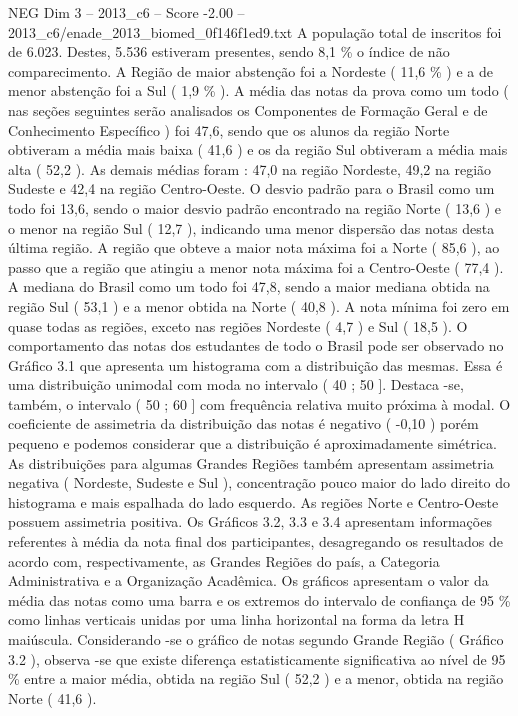 \begin{textsample}{NEG Dim 3 – 2013\_c6 – Score -2.00 – 2013\_c6/enade\_2013\_biomed\_0f146f1ed9.txt}
A população total de inscritos foi de 6.023.
Destes, 5.536 estiveram presentes, sendo 8,1 \% o índice de não comparecimento.
A Região de maior abstenção foi a Nordeste ( 11,6 \% ) e a de menor abstenção foi a Sul ( 1,9 \% ).
A média das notas da prova como um todo ( nas seções seguintes serão analisados os Componentes de Formação Geral e de Conhecimento Específico ) foi 47,6, sendo que os alunos da região Norte obtiveram a média mais baixa ( 41,6 ) e os da região Sul obtiveram a média mais alta ( 52,2 ).
As demais médias foram : 47,0 na região Nordeste, 49,2 na região Sudeste e 42,4 na região Centro-Oeste.
O desvio padrão para o Brasil como um todo foi 13,6, sendo o maior desvio padrão encontrado na região Norte ( 13,6 ) e o menor na região Sul ( 12,7 ), indicando uma menor dispersão das notas desta última região.
A região que obteve a maior nota máxima foi a Norte ( 85,6 ), ao passo que a região que atingiu a menor nota máxima foi a Centro-Oeste ( 77,4 ).
A mediana do Brasil como um todo foi 47,8, sendo a maior mediana obtida na região Sul ( 53,1 ) e a menor obtida na Norte ( 40,8 ).
A nota mínima foi zero em quase todas as regiões, exceto nas regiões Nordeste ( 4,7 ) e Sul ( 18,5 ).
O comportamento das notas dos estudantes de todo o Brasil pode ser observado no Gráfico 3.1 que apresenta um histograma com a distribuição das mesmas.
Essa é uma distribuição unimodal com moda no intervalo ( 40 ; 50 ].
Destaca -se, também, o intervalo ( 50 ; 60 ] com frequência relativa muito próxima à modal.
O coeficiente de assimetria da distribuição das notas é negativo ( -0,10 ) porém pequeno e podemos considerar que a distribuição é aproximadamente simétrica.
As distribuições para algumas Grandes Regiões também apresentam assimetria negativa ( Nordeste, Sudeste e Sul ), concentração pouco maior do lado direito do histograma e mais espalhada do lado esquerdo.
As regiões Norte e Centro-Oeste possuem assimetria positiva.
Os Gráficos 3.2, 3.3 e 3.4 apresentam informações referentes à média da nota final dos participantes, desagregando os resultados de acordo com, respectivamente, as Grandes Regiões do país, a Categoria Administrativa e a Organização Acadêmica.
Os gráficos apresentam o valor da média das notas como uma barra e os extremos do intervalo de confiança de 95 \% como linhas verticais unidas por uma linha horizontal na forma da letra H maiúscula.
Considerando -se o gráfico de notas segundo Grande Região ( Gráfico 3.2 ), observa -se que existe diferença estatisticamente significativa ao nível de 95 \% entre a maior média, obtida na região Sul ( 52,2 ) e a menor, obtida na região Norte ( 41,6 ).

\end{textsample}
